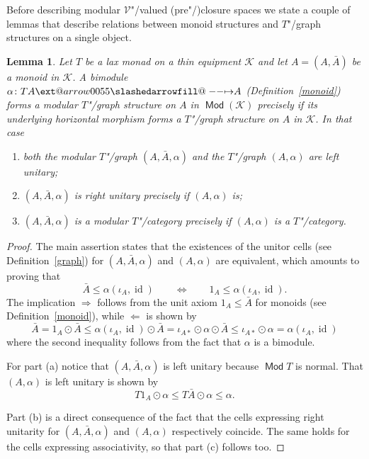 \documentclass[preprint, a4paper]{elsarticle}
\makeatletter
\def\slashedarrowfill@#1#2#3#4#5{%
  $\m@th\thickmuskip0mu\medmuskip\thickmuskip\thinmuskip\thickmuskip
   \relax#5#1\mkern-7mu%
   \cleaders\hbox{$#5\mkern-2mu#2\mkern-2mu$}\hfill
   \mathclap{#3}\mathclap{#2}%
   \cleaders\hbox{$#5\mkern-2mu#2\mkern-2mu$}\hfill
   \mkern-7mu#4$%
}
\def\rightslashedarrowfill@{%
  \slashedarrowfill@\relbar\relbar\mapstochar\rightarrow}
\newcommand\xslashedrightarrow[2][]{%
  \ext@arrow 0055{\rightslashedarrowfill@}{#1}{#2}}
\def\slashedrightarrow{\xslashedrightarrow{}}
\newtheorem{lemma}[theorem]{Lemma}
\theoremstyle{definition}
\theoremstyle{remark}
\providecommand{\defref}[1]{Definition~\ref{#1}}
\renewcommand{\implies}{\Rightarrow}
\renewcommand{\iff}{\Leftrightarrow}
\providecommand{\hmap}[3]{#1\colon#2\slashedrightarrow#3}
\DeclareMathOperator{\id}{id}
\providecommand{\catvar}[1]{\mathcal{#1}}
\providecommand{\2}{\mathsf 2}
\providecommand{\K}{\catvar K}
\providecommand{\V}{\catvar V}
\DeclareMathOperator{\Mod}{\mathsf{Mod}}
\providecommand{\hc}{\odot}
\makeatother
\begin{document}
  Before describing modular $\V$"/valued (pre"/)closure spaces we state a couple of lemmas that describe relations between monoid structures and $T$"/graph structures on a single object.
  \begin{lemma} \label{modular T-graph structure}
  	Let $T$ be a lax monad on a thin equipment $\K$ and let $A = (A, \bar A)$ be a monoid in $\K$. A bimodule $\hmap\alpha{TA}A$ (\defref{monoid}) forms a modular $T$"/graph structure on $A$ in $\Mod(\K)$ precisely if its underlying horizontal morphism forms a $T$"/graph structure on $A$ in $\K$. In that case
  	\begin{enumerate}[label=\textup{(\alph*)}]
  		\item both the modular $T$"/graph $(A, \bar A, \alpha)$ and the $T$"/graph $(A, \alpha)$ are left unitary;
  		\item $(A, \bar A, \alpha)$ is right unitary precisely if $(A, \alpha)$ is;
  		\item $(A, \bar A, \alpha)$ is a modular $T$"/category precisely if $(A, \alpha)$ is a $T$"/category.
  	\end{enumerate}
  \end{lemma}
  \begin{proof}
  	The main assertion states that the existences of the unitor cells (see \defref{graph}) for $(A, \bar A, \alpha)$ and $(A, \alpha)$ are equivalent, which amounts to proving that
  	\begin{displaymath}
  		\bar A \leq \alpha(\iota_A, \id) \qquad \iff \qquad 1_A \leq \alpha(\iota_A, \id).
  	\end{displaymath} 
  	The implication $\implies$ follows from the unit axiom $1_A \leq \bar A$ for monoids (see \defref{monoid}), while $\Leftarrow$ is shown by
  	\begin{displaymath}
  		\bar A = 1_A \hc \bar A \leq \alpha(\iota_A, \id) \hc \bar A = \iota_{A*} \hc \alpha \hc \bar A \leq \iota_{A*} \hc \alpha = \alpha(\iota_A, \id)
  	\end{displaymath}
  	where the second inequality follows from the fact that $\alpha$ is a bimodule.
  	
  	For part (a) notice that $(A, \bar A, \alpha)$ is left unitary because $\Mod T$ is normal. That $(A, \alpha)$ is left unitary is shown by
  	\begin{displaymath}
  		T1_A \hc \alpha \leq T\bar A \hc \alpha \leq \alpha.
  	\end{displaymath}
  	
  	Part (b) is a direct consequence of the fact that the cells expressing right unitarity for $(A, \bar A, \alpha)$ and $(A, \alpha)$ respectively coincide. The same holds for the cells expressing associativity, so that part (c) follows too.
  \end{proof}
  
\end{document}
